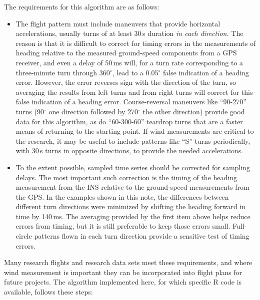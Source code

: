 \documentclass[english,british,amt,bookmarks=false,unicode=true]{copernicus}\usepackage[]{graphicx}\usepackage[]{color}
\begin{document}
The requirements for this algorithm are as follows:
\begin{itemize}
\item The flight pattern must include maneuvers that provide horizontal
accelerations, usually turns of at least 30\,s duration \emph{in
each direction.} The reason is that it is difficult to correct for
timing errors in the measurements of heading relative to the measured
ground-speed components from a GPS receiver, and even a delay of 50\,ms
will, for a turn rate corresponding to a three-minute turn through
360$^{\circ}$, lead to a 0.05$^{\circ}$ false indication of a heading
error. However, the error reverses sign with the direction of the
turn, so averaging the results from left turns and from right turns
will correct for this false indication of a heading error. Course-reversal
maneuvers like ``90-270'' turns (90$^{\circ}$ one direction followed
by 270$^{\circ}$ the other direction) provide good data for this
algorithm, as do ``60-300-60'' teardrop turns that are a faster
means of returning to the starting point. If wind measurements are
critical to the research, it may be useful to include patterns like
``S'' turns periodically, with 30\,s turns in opposite directions,
to provide the needed accelerations.
\item To the extent possible, sampled time series should be corrected for
sampling delays. The most important such correction is the timing
of the heading measurement from the INS relative to the ground-speed
measurements from the GPS. In the examples shown in this note, the
differences between different turn directions were minimized by shifting
the heading forward in time by 140\,ms. The averaging provided by
the first item above helps reduce errors from timing, but it is still
preferable to keep those errors small. Full-circle patterns flown
in each turn direction provide a sensitive test of timing errors.
\end{itemize}
Many research flights and research data sets meet these requirements,
and where wind measurement is important they can be incorporated into
flight plans for future projects. The algorithm implemented here,
for which specific R code is available, follows these steps:
\end{document}

